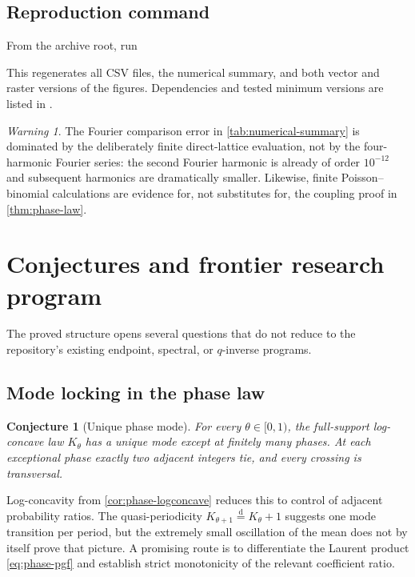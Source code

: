 \documentclass[11pt,oneside]{article}
\newtheorem{conjecture}[theorem]{Conjecture}
\theoremstyle{definition}
\theoremstyle{remark}
\newtheorem{warning}[theorem]{Warning}
\begin{document}
\subsection{Reproduction command}

From the archive root, run
\begin{center}
\setlength{\fboxsep}{7pt}
\end{center}
This regenerates all CSV files, the numerical summary, and both vector and
raster versions of the figures.  Dependencies and tested minimum versions are
listed in .

\begin{warning}
The Fourier comparison error in \cref{tab:numerical-summary} is dominated by
the deliberately finite direct-lattice evaluation, not by the four-harmonic
Fourier series: the second Fourier harmonic is already of order $10^{-12}$ and
subsequent harmonics are dramatically smaller.  Likewise, finite
Poisson--binomial calculations are evidence for, not substitutes for, the
coupling proof in \cref{thm:phase-law}.
\end{warning}

\section{Conjectures and frontier research program}
\label{sec:frontiers}

The proved structure opens several questions that do not reduce to the
repository's existing endpoint, spectral, or $q$-inverse programs.

\subsection{Mode locking in the phase law}

\begin{conjecture}[Unique phase mode]
\label{conj:unique-mode}
For every $\theta\in[0,1)$, the full-support log-concave law $K_\theta$ has a
unique mode except at finitely many phases.  At each exceptional phase exactly
two adjacent integers tie, and every crossing is transversal.
\end{conjecture}

Log-concavity from \cref{cor:phase-logconcave} reduces this to control of
adjacent probability ratios.  The quasi-periodicity
$K_{\theta+1}\stackrel{\mathrm d}=K_\theta+1$ suggests one mode transition per
period, but the extremely small oscillation of the mean does not by itself
prove that picture.  A promising route is to differentiate the Laurent
product \eqref{eq:phase-pgf} and establish strict monotonicity of the relevant
coefficient ratio.
\end{document}
